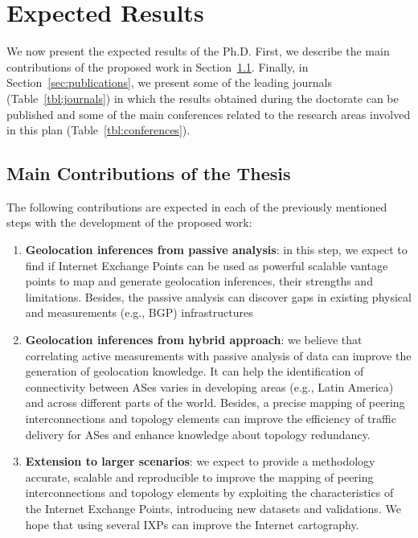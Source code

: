\chapter{Expected Results}\label{cap:expected-results}
\thispagestyle{empty}

	We now present the expected results of the Ph.D. First, we describe the main contributions of the proposed work in Section~\ref{sec:contributions}. Finally, in Section~\ref{sec:publications}, we present some of the leading journals (Table~\ref{tbl:journals}) in which the results obtained during the doctorate can be published and some of the main conferences related to the research areas involved in this plan (Table~\ref{tbl:conferences}).

	\section{Main Contributions of the Thesis}\label{sec:contributions}
	\thispagestyle{empty}

	The following contributions are expected in each of the previously mentioned steps with the development of the proposed work:

	\begin{enumerate}

	\item {\bf Geolocation inferences from passive analysis}: in this step, we expect to find if Internet Exchange Points can be used as powerful scalable vantage points to map and generate geolocation inferences, their strengths and limitations. Besides, the passive analysis can discover gaps in existing physical and measurements (e.g., BGP) infrastructures

	\item {\bf Geolocation inferences from hybrid approach}: we believe that correlating active measurements with passive analysis of data can improve the generation of geolocation knowledge. It can help the identification of connectivity between ASes varies in developing areas (e.g., Latin America) and across different parts of the world. Besides, a precise mapping of peering interconnections and topology elements can improve the efficiency of traffic delivery for ASes and enhance knowledge about topology redundancy.

	\item {\bf Extension to larger scenarios}: we expect to provide a methodology accurate, scalable and reproducible to improve the mapping of peering interconnections and topology elements by exploiting the characteristics of the Internet Exchange Points, introducing new datasets and validations. We hope that using several IXPs can improve the Internet cartography.
 
    \end{enumerate}

